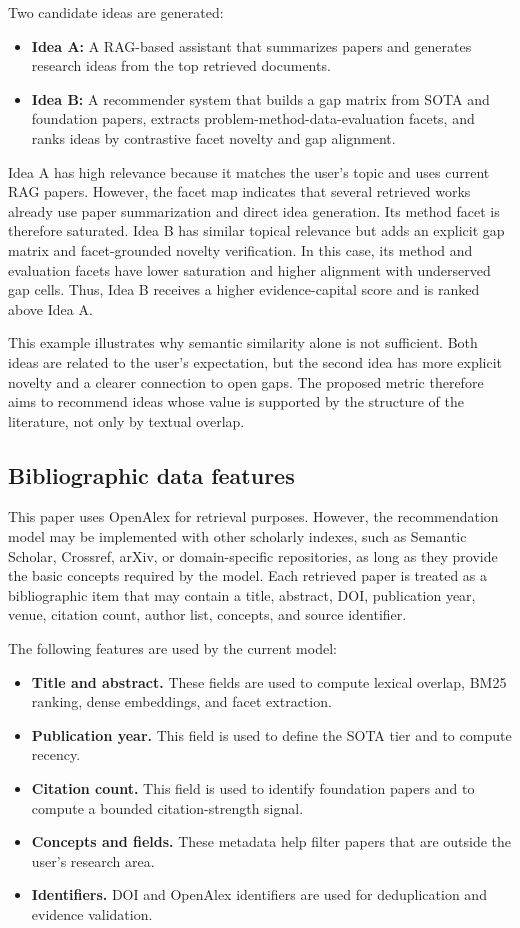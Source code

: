 \documentclass[preprint,12pt]{elsarticle}
\begin{document}
Two candidate ideas are generated:
\begin{itemize}
  \item \textbf{Idea A:} A RAG-based assistant that summarizes papers and generates research ideas from the top retrieved documents.
  \item \textbf{Idea B:} A recommender system that builds a gap matrix from SOTA and foundation papers, extracts problem-method-data-evaluation facets, and ranks ideas by contrastive facet novelty and gap alignment.
\end{itemize}

Idea A has high relevance because it matches the user's topic and uses current RAG papers. However, the facet map indicates that several retrieved works already use paper summarization and direct idea generation. Its method facet is therefore saturated. Idea B has similar topical relevance but adds an explicit gap matrix and facet-grounded novelty verification. In this case, its method and evaluation facets have lower saturation and higher alignment with underserved gap cells. Thus, Idea B receives a higher evidence-capital score and is ranked above Idea A.

This example illustrates why semantic similarity alone is not sufficient. Both ideas are related to the user's expectation, but the second idea has more explicit novelty and a clearer connection to open gaps. The proposed metric therefore aims to recommend ideas whose value is supported by the structure of the literature, not only by textual overlap.

\subsection{Bibliographic data features}

This paper uses OpenAlex for retrieval purposes. However, the recommendation model may be implemented with other scholarly indexes, such as Semantic Scholar, Crossref, arXiv, or domain-specific repositories, as long as they provide the basic concepts required by the model. Each retrieved paper is treated as a bibliographic item that may contain a title, abstract, DOI, publication year, venue, citation count, author list, concepts, and source identifier.

The following features are used by the current model:
\begin{itemize}
  \item \textbf{Title and abstract.} These fields are used to compute lexical overlap, BM25 ranking, dense embeddings, and facet extraction.
  \item \textbf{Publication year.} This field is used to define the SOTA tier and to compute recency.
  \item \textbf{Citation count.} This field is used to identify foundation papers and to compute a bounded citation-strength signal.
  \item \textbf{Concepts and fields.} These metadata help filter papers that are outside the user's research area.
  \item \textbf{Identifiers.} DOI and OpenAlex identifiers are used for deduplication and evidence validation.
\end{itemize}
\end{document}
